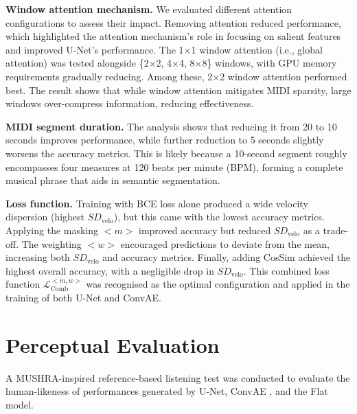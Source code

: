 \textbf{Window attention mechanism.} We evaluated different attention configurations to assess their impact. Removing attention reduced performance, which highlighted the attention mechanism's role in focusing on salient features and improved U-Net's performance. The 1×1 window attention (i.e., global attention) was tested alongside \{2×2, 4×4, 8×8\} windows, with GPU memory requirements gradually reducing. Among these, 2×2 window attention performed best. The result shows that while window attention mitigates MIDI sparsity, large windows over-compress information, reducing effectiveness.

\textbf{MIDI segment duration.} The analysis shows that reducing it from 20 to 10 seconds improves performance, while further reduction to 5 seconds slightly worsens the accuracy metrics. This is likely because a 10-second segment roughly encompasses four measures at 120 beats per minute (BPM), forming a complete musical phrase that aids in semantic segmentation.

\textbf{Loss function.} Training with BCE loss alone produced a wide velocity dispersion (highest \(SD_{\text{velo}}\)), but this came with the lowest accuracy metrics. Applying the masking $<m>$ improved accuracy but reduced \(SD_{\text{velo}}\) as a trade-off. The weighting $<w>$ encouraged predictions to deviate from the mean, increasing both \(SD_{\text{velo}}\) and accuracy metrics. Finally, adding CosSim achieved the highest overall accuracy, with a negligible drop in \(SD_{\text{velo}}\). This combined loss function $\mathcal{L}_{\mathrm{Comb}}^{<m,w>}$ was recognised as the optimal configuration and applied in the training of both U-Net and ConvAE.




\section{Perceptual Evaluation}
\label{sec:velcomp:perceptual}

A MUSHRA-inspired reference-based listening test was conducted to evaluate the human-likeness of performances generated by U-Net, ConvAE \cite{kuo2021velocity}, and the Flat model.

